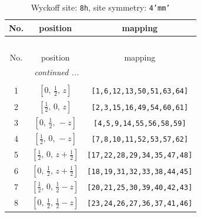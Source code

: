 \documentclass[fleqn,8pt]{jsarticle}
\begin{document}
\begin{longtable}{ccc}
\caption{Wyckoff site: {\tt 8h}, site symmetry: {\tt 4'mm'}}
 \\
 \hline \hline
No. & position & mapping \\ \hline \endfirsthead

\multicolumn{2}{l}{\tablename\ \thetable{}} \\
 \hline \hline
No. & position & mapping \\ \hline \endhead

 \hline \hline
\multicolumn{2}{r}{\footnotesize\it continued ...} \\ \endfoot

 \hline \hline
\multicolumn{2}{r}{} \\ \endlastfoot

1 & $\left[ 0,\, \frac{1}{2},\, z \right]$ & {\tt [1,6,12,13,50,51,63,64]} \\ \hline
2 & $\left[ \frac{1}{2},\, 0,\, z \right]$ & {\tt [2,3,15,16,49,54,60,61]} \\ \hline
3 & $\left[ 0,\, \frac{1}{2},\, - z \right]$ & {\tt [4,5,9,14,55,56,58,59]} \\ \hline
4 & $\left[ \frac{1}{2},\, 0,\, - z \right]$ & {\tt [7,8,10,11,52,53,57,62]} \\ \hline
5 & $\left[ \frac{1}{2},\, 0,\, z + \frac{1}{2} \right]$ & {\tt [17,22,28,29,34,35,47,48]} \\ \hline
6 & $\left[ 0,\, \frac{1}{2},\, z + \frac{1}{2} \right]$ & {\tt [18,19,31,32,33,38,44,45]} \\ \hline
7 & $\left[ \frac{1}{2},\, 0,\, \frac{1}{2} - z \right]$ & {\tt [20,21,25,30,39,40,42,43]} \\ \hline
8 & $\left[ 0,\, \frac{1}{2},\, \frac{1}{2} - z \right]$ & {\tt [23,24,26,27,36,37,41,46]} \\
\end{longtable}
\renewcommand{\arraystretch}{1.2}
\end{document}
